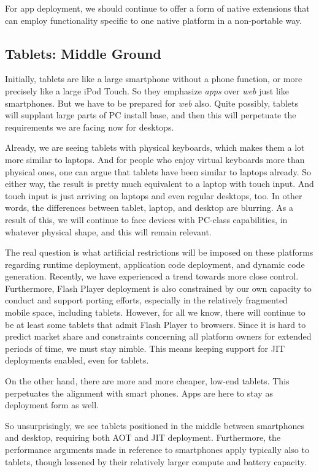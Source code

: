 For app deployment, we should continue to offer a form of native extensions that
can employ functionality specific to one native platform in a non-portable way.

\subsection{Tablets: Middle Ground}
Initially, tablets are like a large smartphone without a phone function, or more
precisely like a large iPod Touch. So they emphasize {\em apps} over {\em web}
just like smartphones. But we have to be prepared for {\em web} also. Quite
possibly, tablets will supplant large parts of PC install base, and then this will perpetuate the
requirements we are facing now for desktops.

Already, we are seeing tablets with physical keyboards, which makes them a lot
more similar to laptops. And for people who enjoy virtual keyboards more than
physical ones, one can argue that tablets have been similar to laptops already.
So either way, the result is pretty much equivalent to a laptop with touch
input. And touch input is just arriving on laptops and even regular desktops,
too. In other words, the differences between tablet, laptop, and desktop are
blurring. As a result of this, we will continue to face devices with PC-class
capabilities, in whatever physical shape, and this will remain relevant.

The real question is what artificial restrictions will be imposed on these
platforms regarding runtime deployment, application code deployment, and dynamic
code generation. Recently, we have experienced a trend towards more close
control. Furthermore, Flash Player deployment is also constrained by our own
capacity to conduct and support porting efforts, especially in the relatively fragmented
mobile space, including tablets. However, for all we know, there will continue
to be at least some tablets that admit Flash Player to browsers.
Since it is hard to predict market share and constraints concerning all platform owners
for extended periods of time, we must stay nimble. This means keeping support for
JIT deployments enabled, even for tablets.

On the other hand, there are more and more cheaper, low-end tablets. This
perpetuates the alignment with smart phones. Apps are here to stay as
deployment form as well.

So unsurprisingly, we see tablets positioned in the middle between smartphones
and desktop, requiring both AOT and JIT deployment. Furthermore, the performance
arguments made in reference to smartphones apply typically also to tablets,
though lessened by their relatively larger compute and battery capacity.

